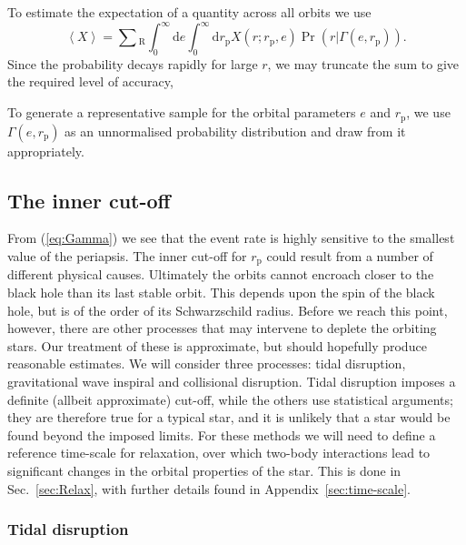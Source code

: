 \documentclass[useAMS,usedcolumn,usegraphicx,usenatbib]{mn2e}
\newcommand{\eqnref}[1]{(\ref{eq:#1})}
\newcommand{\secref}[1]{Sec.~\ref{sec:#1}}
\newcommand{\apref}[1]{Appendix~\ref{sec:#1}}
\newcommand{\sub}[1]{\ensuremath{_\mathrm{#1}}}
\newcommand{\dd}{\ensuremath{\mathrm{d}}}
\begin{document}
To estimate the expectation of a quantity across all orbits we use
\begin{equation}
\left\langle X\right\rangle = \sum\sub{R} \int_0^\infty \dd e \int_0^\infty \dd r\sub{p} X(r;r\sub{p},e)\Pr(r|\Gamma(e, r\sub{p})).
\end{equation}
Since the probability decays rapidly for large $r$, we may truncate the sum to give the required level of accuracy,

To generate a representative sample for the orbital parameters $e$ and $r\sub{p}$, we use $\Gamma(e, r\sub{p})$ as an unnormalised probability distribution and draw from it appropriately.

\subsection{The inner cut-off}

From \eqnref{Gamma} we see that the event rate is highly sensitive to the smallest value of the periapsis. The inner cut-off for $r\sub{p}$ could result from a number of different physical causes. Ultimately the orbits cannot encroach closer to the black hole than its last stable orbit. This depends upon the spin of the black hole, but is of the order of its Schwarzschild radius. Before we reach this point, however, there are other processes that may intervene to deplete the orbiting stars. Our treatment of these is approximate, but should hopefully produce reasonable estimates. We will consider three processes: tidal disruption, gravitational wave inspiral and collisional disruption. Tidal disruption imposes a definite (allbeit approximate) cut-off, while the others use statistical arguments; they are therefore true for a typical star, and it is unlikely that a star would be found beyond the imposed limits. For these methods we will need to define a reference time-scale for relaxation, over which two-body interactions lead to significant changes in the orbital properties of the star. This is done in \secref{Relax}, with further details found in \apref{time-scale}.

\subsubsection{Tidal disruption}
\end{document}
